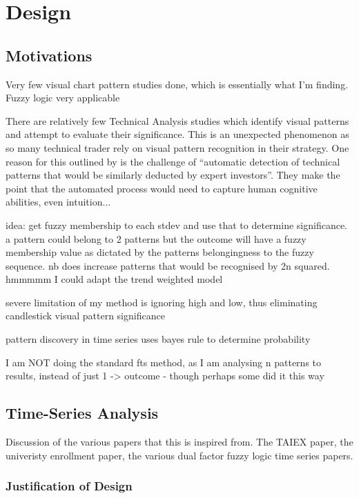 \documentclass{article}
\theoremstyle{definition}
\begin{document}
\section{Design}

\subsection{Motivations}

Very few visual chart pattern studies done, which is essentially what I'm finding. Fuzzy logic very applicable

There are relatively few Technical Analysis studies which identify visual patterns and attempt to evaluate their significance. This is an unexpected phenomenon as so many technical trader rely on visual pattern recognition in their strategy. One reason for this outlined by \cite{2020} is the challenge of ``automatic detection of technical patterns that would be similarly deducted by expert investors''. They make the point that the automated process would need to capture human cognitive abilities, even intuition...

idea: get fuzzy membership to each stdev and use that to determine significance. a pattern could belong to 2 patterns but the outcome will have a fuzzy membership value as dictated by the patterns belongingness to the fuzzy sequence. nb does increase patterns that would be recognised by 2n squared.
hmmmmm I could adapt the trend weighted model

severe limitation of my method is ignoring high and low, thus eliminating candlestick visual pattern significance

pattern discovery in time series uses bayes rule to determine probability

I am NOT doing the standard fts method, as I am analysing n patterns to results, instead of just 1 -> outcome - though perhaps some did it this way

\subsection{Time-Series Analysis}

Discussion of the various papers that this is inspired from. The TAIEX paper, the univeristy enrollment paper,  the various dual factor fuzzy logic time series papers.

\subsubsection{Justification of Design}
\end{document}
